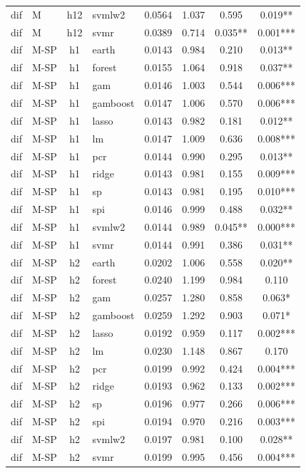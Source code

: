 \begin{ThreePartTable}
\begin{longtable}[t]{llclcccc}
dif & M & h12 & svmlw2 & 0.0564 & 1.037 & 0.595 & 0.019**\\
dif & M & h12 & svmr & 0.0389 & 0.714 & 0.035** & 0.001***\\
\addlinespace
dif & M-SP & h1 & earth & 0.0143 & 0.984 & 0.210 & 0.013**\\
dif & M-SP & h1 & forest & 0.0155 & 1.064 & 0.918 & 0.037**\\
dif & M-SP & h1 & gam & 0.0146 & 1.003 & 0.544 & 0.006***\\
dif & M-SP & h1 & gamboost & 0.0147 & 1.006 & 0.570 & 0.006***\\
dif & M-SP & h1 & lasso & 0.0143 & 0.982 & 0.181 & 0.012**\\
dif & M-SP & h1 & lm & 0.0147 & 1.009 & 0.636 & 0.008***\\
dif & M-SP & h1 & pcr & 0.0144 & 0.990 & 0.295 & 0.013**\\
dif & M-SP & h1 & ridge & 0.0143 & 0.981 & 0.155 & 0.009***\\
dif & M-SP & h1 & sp & 0.0143 & 0.981 & 0.195 & 0.010***\\
dif & M-SP & h1 & spi & 0.0146 & 0.999 & 0.488 & 0.032**\\
dif & M-SP & h1 & svmlw2 & 0.0144 & 0.989 & 0.045** & 0.000***\\
dif & M-SP & h1 & svmr & 0.0144 & 0.991 & 0.386 & 0.031**\\
\addlinespace
dif & M-SP & h2 & earth & 0.0202 & 1.006 & 0.558 & 0.020**\\
dif & M-SP & h2 & forest & 0.0240 & 1.199 & 0.984 & 0.110\\
dif & M-SP & h2 & gam & 0.0257 & 1.280 & 0.858 & 0.063*\\
dif & M-SP & h2 & gamboost & 0.0259 & 1.292 & 0.903 & 0.071*\\
dif & M-SP & h2 & lasso & 0.0192 & 0.959 & 0.117 & 0.002***\\
dif & M-SP & h2 & lm & 0.0230 & 1.148 & 0.867 & 0.170\\
dif & M-SP & h2 & pcr & 0.0199 & 0.992 & 0.424 & 0.004***\\
dif & M-SP & h2 & ridge & 0.0193 & 0.962 & 0.133 & 0.002***\\
dif & M-SP & h2 & sp & 0.0196 & 0.977 & 0.266 & 0.006***\\
dif & M-SP & h2 & spi & 0.0194 & 0.970 & 0.216 & 0.003***\\
dif & M-SP & h2 & svmlw2 & 0.0197 & 0.981 & 0.100 & 0.028**\\
dif & M-SP & h2 & svmr & 0.0199 & 0.995 & 0.456 & 0.004***\\

\end{longtable}
\end{ThreePartTable}
